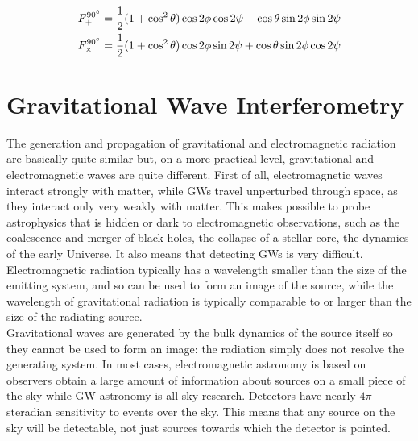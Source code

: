 \documentclass[binding=0.6cm, LaM]{sapthesis}
\begin{document}
                \begin{align}
                F_{+}^{\ang{90}}& = {1 \over 2} (1 + \cos^2 \theta)\cos 2\phi \cos 2 \psi - \cos \theta \sin2\phi \sin2\psi \\
                F_{\times}^{\ang{90}}& = {1 \over 2} (1 + \cos^2 \theta)\cos 2\phi \sin 2 \psi + \cos \theta \sin2\phi \cos2\psi
                \end{align}

\section{Gravitational Wave Interferometry}

	The generation and propagation of gravitational and electromagnetic radiation are basically quite similar but, 
	on a more practical level, gravitational and electromagnetic waves are quite different.
	First of all, electromagnetic waves interact strongly with matter, while GWs travel unperturbed through space, 
	as they interact only very weakly with matter. This makes possible to probe astrophysics that is hidden or dark 
	to electromagnetic observations, such as the coalescence and merger of black holes, the collapse of a stellar core, 
	the dynamics of the early Universe. It also means that detecting GWs is very difficult. \\
	Electromagnetic radiation typically has a wavelength smaller than the size of the emitting system, 
	and so can be used to form an image of the source, while the wavelength of gravitational radiation is typically comparable 
	to or larger than the size of the radiating source. \\
	Gravitational waves are generated by the bulk dynamics of the source itself so they cannot be used to form an image: 
	the radiation simply does not resolve the generating system. 
	In most cases, electromagnetic astronomy is based on observers obtain a large amount of information about sources on a small piece 
	of the sky while GW astronomy is all-sky research.
	Detectors have nearly $4\pi$ steradian sensitivity to events over the sky. This means that any source on the sky will be detectable, 
	not just sources towards which the detector is pointed. 
\end{document}

